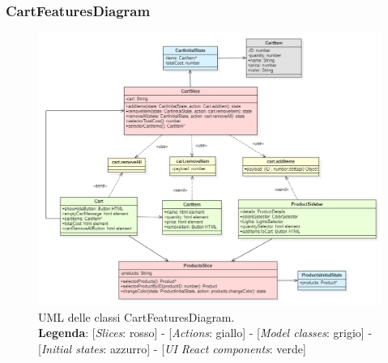\subsubsection{CartFeaturesDiagram}
\label{CartFeaturesDiagram}
\begin{figure}[H]
	\includegraphics[width=1\textwidth, keepaspectratio]{./res/images/cart_features.PNG}
	\caption[UML delle classi CartFeaturesDiagram]{
	UML delle classi CartFeaturesDiagram.
	\\
	\textbf{Legenda}: 
	[\textit{Slices}: rosso] -
	[\textit{Actions}: giallo] -
	[\textit{Model classes}: grigio] -
	[\textit{Initial states}: azzurro] -
	[\textit{UI React components}: verde]}
\end{figure}

